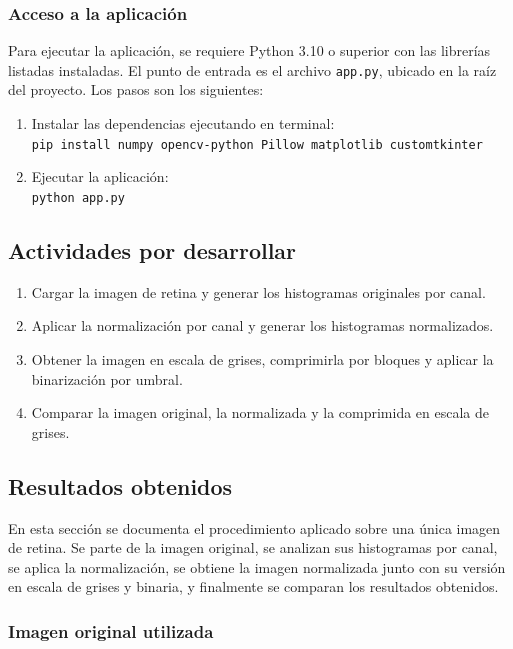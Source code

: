 \documentclass[11pt]{article}
\begin{document}
\subsubsection{Acceso a la aplicación}
Para ejecutar la aplicación, se requiere Python 3.10 o superior con las librerías listadas instaladas. El punto de entrada es el archivo \texttt{app.py}, ubicado en la raíz del proyecto. Los pasos son los siguientes:

\begin{enumerate}
    \item Instalar las dependencias ejecutando en terminal:\\
          \texttt{pip install numpy opencv-python Pillow matplotlib customtkinter}
    \item Ejecutar la aplicación:\\
          \texttt{python app.py}
\end{enumerate}

\subsection{Actividades por desarrollar}
\begin{enumerate}
    \item Cargar la imagen de retina y generar los histogramas originales por canal.
    \item Aplicar la normalización por canal y generar los histogramas normalizados.
    \item Obtener la imagen en escala de grises, comprimirla por bloques y aplicar la binarización por umbral.
    \item Comparar la imagen original, la normalizada y la comprimida en escala de grises.
\end{enumerate}

\subsection{Resultados obtenidos}

En esta sección se documenta el procedimiento aplicado sobre una única imagen de retina. Se parte de la imagen original, se analizan sus histogramas por canal, se aplica la normalización, se obtiene la imagen normalizada junto con su versión en escala de grises y binaria, y finalmente se comparan los resultados obtenidos.

\subsubsection{Imagen original utilizada}
\end{document}
